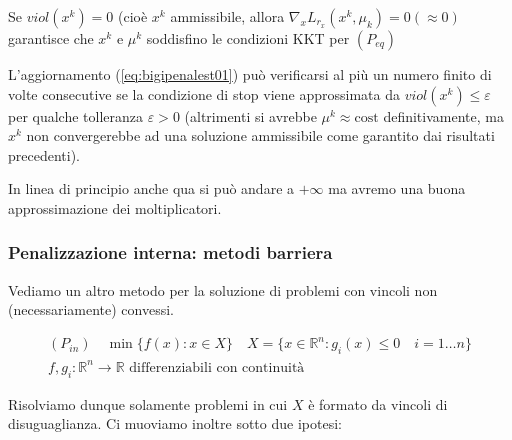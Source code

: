 \begin{observation}
 Se $viol(x^{k}) = 0$ (cio\`e $x^{k}$ ammissibile, allora
$\nabla_{x} L_{r_x}(x^{k}, \mu_k) = 0 (\approx 0)$ garantisce
che $x^{k}$ e $\mu^{k}$ soddisfino le condizioni KKT per
$(P_{eq})$
\end{observation}
\begin{observation}
 L'aggiornamento (\ref{eq:bigipenalest01}) pu\`o verificarsi al pi\`u un numero
finito di volte consecutive se la condizione di stop
viene approssimata da $viol(x^{k})\leq \varepsilon$ per qualche
tolleranza $\varepsilon > 0 $ (altrimenti si avrebbe $\mu^{k}
\approx \text{cost}$ definitivamente, ma $x^{k}$ non convergerebbe
ad una soluzione ammissibile come garantito dai risultati
 precedenti). 
\end{observation}
In linea di principio anche qua si pu\`o andare a
$+ \infty$ ma avremo una buona approssimazione
dei moltiplicatori.



\subsubsection{Penalizzazione interna: metodi barriera}
Vediamo un altro metodo per la soluzione di problemi con vincoli non (necessariamente) convessi.

$$
\begin{array}{c}
(P_{in})\quad \min \{f(x) : x \in X \} \quad X = \{x \in \mathbb{R}^{n} :
g_i(x) \leq 0 \quad i = 1 \ldots n \} \\
 f,g_i: \mathbb{R}^{n} \rightarrow \mathbb{R}  \text{ differenziabili con continuit\`a }
\end{array}
$$

Risolviamo dunque solamente problemi in cui $X$ è formato da vincoli di disuguaglianza. Ci muoviamo inoltre sotto due ipotesi:

